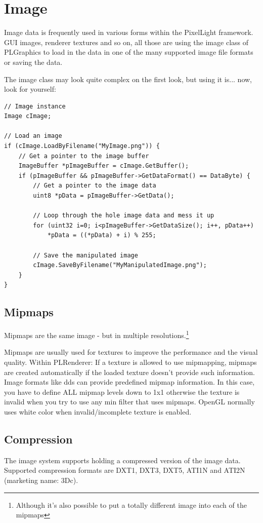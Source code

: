 \section{Image}
Image data is frequently used in various forms within the PixelLight framework. GUI images, renderer textures and so on, all those are using the image class of PLGraphics to load in the data in one of the many supported image file formats or saving the data.

The image class may look quite complex on the first look, but using it is... now, look for yourself:

\begin{lstlisting}[caption=Image usage]
// Image instance
Image cImage;

// Load an image
if (cImage.LoadByFilename("MyImage.png")) {
	// Get a pointer to the image buffer
	ImageBuffer *pImageBuffer = cImage.GetBuffer();
	if (pImageBuffer && pImageBuffer->GetDataFormat() == DataByte) {
		// Get a pointer to the image data
		uint8 *pData = pImageBuffer->GetData();

		// Loop through the hole image data and mess it up
		for (uint32 i=0; i<pImageBuffer->GetDataSize(); i++, pData++)
			*pData = ((*pData) + i) % 255;

		// Save the manipulated image
		cImage.SaveByFilename("MyManipulatedImage.png");
	}
}
\end{lstlisting}




\subsection{Mipmaps}
Mipmaps are the same image - but in multiple resolutions.\footnote{Although it's also possible to put a totally different image into each of the mipmaps}

Mipmaps are usually used for textures to improve the performance and the visual quality.
Within PLRenderer: If a texture is allowed to use mipmapping, mipmaps are created automatically if the loaded texture doesn't provide such information. Image formats like dds can provide predefined mipmap information. In this case, you have to define ALL mipmap levels down to 1x1 otherwise the texture is invalid when you try to use any min filter that uses mipmaps. OpenGL normally uses white color when invalid/incomplete texture is enabled.




\subsection{Compression}
The image system supports holding a compressed version of the image data. Supported compression formats are DXT1, DXT3, DXT5, ATI1N and ATI2N (marketing name: 3Dc).

